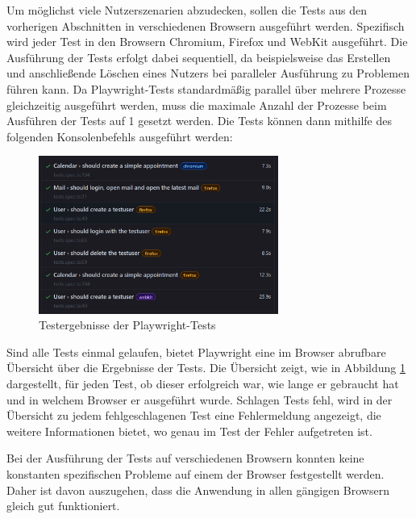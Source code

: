 Um möglichst viele Nutzerszenarien abzudecken, sollen die Tests aus den vorherigen Abschnitten in verschiedenen Browsern ausgeführt werden.
Spezifisch wird jeder Test in den Browsern Chromium, Firefox und WebKit ausgeführt.
Die Ausführung der Tests erfolgt dabei sequentiell, da beispielsweise das Erstellen und anschließende Löschen eines Nutzers bei paralleler Ausführung zu Problemen führen kann.
Da Playwright-Tests standardmäßig parallel über mehrere Prozesse gleichzeitig ausgeführt werden, muss die maximale Anzahl der Prozesse beim Ausführen der Tests auf 1 gesetzt werden. Die Tests können dann mithilfe des folgenden Konsolenbefehls ausgeführt werden:


\begin{figure}[H]
    \centering
    \includegraphics[width=0.7\textwidth]{images/PlaywrightResults.png}
    \caption{Testergebnisse der Playwright-Tests}
    \label{fig:playwright-results}
\end{figure}

Sind alle Tests einmal gelaufen, bietet Playwright eine im Browser abrufbare Übersicht über die Ergebnisse der Tests.
Die Übersicht zeigt, wie in Abbildung \ref{fig:playwright-results} dargestellt, für jeden Test, ob dieser erfolgreich war, wie lange er gebraucht hat und in welchem Browser er ausgeführt wurde.
Schlagen Tests fehl, wird in der Übersicht zu jedem fehlgeschlagenen Test eine Fehlermeldung angezeigt, die weitere Informationen bietet, wo genau im Test der Fehler aufgetreten ist.

Bei der Ausführung der Tests auf verschiedenen Browsern konnten keine konstanten spezifischen Probleme auf einem der Browser festgestellt werden.
Daher ist davon auszugehen, dass die Anwendung in allen gängigen Browsern gleich gut funktioniert.


